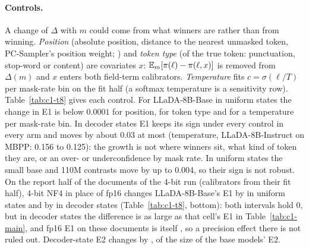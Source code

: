 \paragraph{Controls.}
A change of $\Delta$ with $m$ could come from what winners are rather than from winning.
\emph{Position} (absolute position, distance to the nearest unmasked token,
PC-Sampler's position weight; \citealp{huang2025pcsampler}) and \emph{token type} (of the true
token: punctuation, stop-word or content) are covariates $x$: $\mathbb{E}_m[\pi(\ell)-\pi(\ell,x)]$
is removed from $\Delta(m)$ and $x$ enters both field-term calibrators. \emph{Temperature}
fits $c=\sigma(\ell/T)$ per mask-rate bin on the fit half (a softmax temperature is a sensitivity row).
Table~\ref{tab:c1-t8} gives each control. For LLaDA-8B-Base in uniform states the change in E1
is below $0.0001$ for position,
 for token type and
 for a temperature per mask-rate bin.
In decoder states E1 keeps its sign under every control in every arm and moves by about
0.03 at most (temperature, LLaDA-8B-Instruct on MBPP: 0.156 to 0.125): the growth is not where
winners sit, what kind of token they are, or an over- or underconfidence by mask rate. In
uniform states the small base and 110M contrasts move by up to 0.004, so their sign is not
robust.
On the report half of the \VivaLladaBaseFourBitDocs{} documents of the 4-bit run (calibrators
from their fit half), 4-bit NF4 in place of fp16 changes LLaDA-8B-Base's E1 by
 in uniform states and by
 in decoder states
(Table~\ref{tab:c1-t8}, bottom): both intervals hold 0, but in decoder states the difference is as large as that cell's E1
in Table~\ref{tab:c1-main}, and fp16 E1 on these documents is itself
, so a precision effect
there is not ruled out. Decoder-state E2 changes by
, of the size of the
base models' E2.

